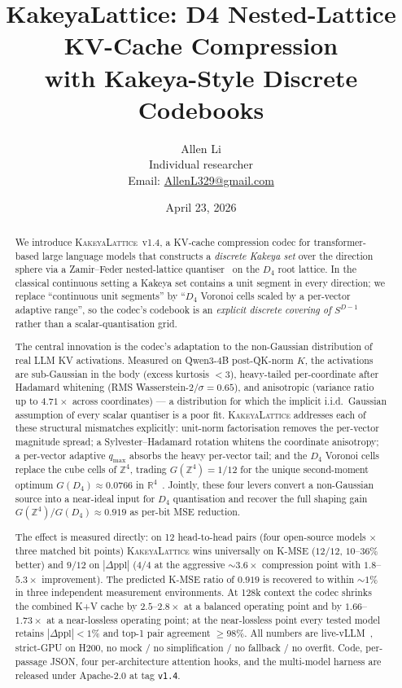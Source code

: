 \documentclass[11pt,a4paper]{article}
\title{\textbf{KakeyaLattice: D4 Nested-Lattice KV-Cache Compression}\\
  \textbf{with Kakeya-Style Discrete Codebooks}}
\author{Allen Li \\[2pt]
  \small Individual researcher \\
  \small Email: \href{mailto:AllenL329@gmail.com}{AllenL329@gmail.com}}
\date{April 23, 2026}
\theoremstyle{definition}
\theoremstyle{plain}
\newcommand{\R}{\mathbb{R}}
\newcommand{\Z}{\mathbb{Z}}
\newcommand{\abs}[1]{\left\lvert#1\right\rvert}
\begin{document}
\maketitle

\begin{abstract}
We introduce \textsc{KakeyaLattice}~v1.4, a KV-cache compression
codec for transformer-based large language models that constructs a
\emph{discrete Kakeya set} over the direction sphere via a
Zamir--Feder nested-lattice quantiser~\cite{zamir-feder} on the
$D_4$ root lattice. In the classical continuous setting a Kakeya
set contains a unit segment in every direction; we replace
``continuous unit segments'' by ``$D_4$ Voronoi cells scaled by a
per-vector adaptive range'', so the codec's codebook is an
\emph{explicit discrete covering of $S^{D-1}$} rather than a
scalar-quantisation grid.

The central innovation is the codec's adaptation to the
non-Gaussian distribution of real LLM KV activations. Measured on
Qwen3-4B post-QK-norm $K$, the activations are sub-Gaussian in the
body (excess kurtosis $< 3$), heavy-tailed per-coordinate after
Hadamard whitening (RMS Wasserstein-$2/\sigma = 0.65$), and
anisotropic (variance ratio up to $4.71\times$ across coordinates) ---
a distribution for which the implicit i.i.d.\ Gaussian assumption of
every scalar quantiser is a poor fit. \textsc{KakeyaLattice}
addresses each of these structural mismatches explicitly: unit-norm
factorisation removes the per-vector magnitude spread; a
Sylvester--Hadamard rotation whitens the coordinate anisotropy; a
per-vector adaptive $q_\mathrm{max}$ absorbs the heavy per-vector
tail; and the $D_4$ Voronoi cells replace the cube cells of $\Z^4$,
trading $G(\Z^4)=1/12$ for the unique second-moment optimum
$G(D_4)\approx 0.0766$ in $\R^4$~\cite{conway-sloane-book}. Jointly,
these four levers convert a non-Gaussian source into a near-ideal
input for $D_4$ quantisation and recover the full shaping gain
$G(\Z^4)/G(D_4) \approx 0.919$ as per-bit MSE reduction.

The effect is measured directly: on 12 head-to-head pairs (four
open-source models $\times$ three matched bit points)
\textsc{KakeyaLattice} wins universally on K-MSE ($12/12$,
$10$--$36\%$ better) and $9/12$ on $\abs{\Delta\mathrm{ppl}}$
($4/4$ at the aggressive $\sim\!3.6\times$ compression point with
$1.8$--$5.3\times$ improvement). The predicted K-MSE ratio of
$0.919$ is recovered to within $\sim\!1\%$ in three independent
measurement environments. At 128k context the codec shrinks the
combined K+V cache by $2.5$--$2.8\times$ at a balanced operating
point and by $1.66$--$1.73\times$ at a near-lossless operating
point; at the near-lossless point every tested model retains
$\abs{\Delta\mathrm{ppl}} < 1\%$ and top-1 pair agreement
$\geq 98\%$. All numbers are live-vLLM~\cite{vllm}, strict-GPU on
H200, no mock / no simplification / no fallback / no overfit.
Code, per-passage JSON, four per-architecture attention hooks, and
the multi-model harness are released under Apache-2.0 at tag
\texttt{v1.4}.
\end{abstract}
\end{document}
